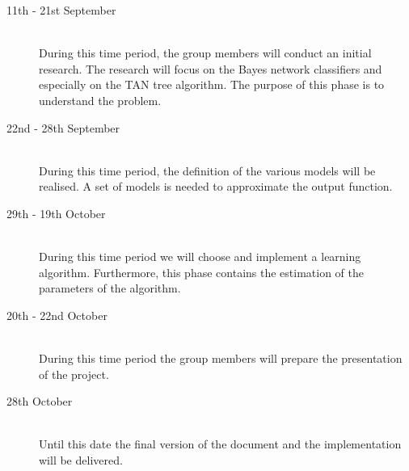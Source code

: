 \documentclass[a4paper, 11pt]{scrartcl}
\begin{document}
\begin{description}
	\item[11th - 21st September]\-\\
	During this time period, the group members will conduct an initial research. The research will focus on the Bayes network classifiers and especially on the TAN tree algorithm. The purpose of this phase is to understand the problem.
	\item[22nd - 28th September]\-\\
	During this time period, the definition of the various models will be realised. A set of models is needed to approximate the output function.
	\item[29th - 19th October]\-\\
	During this time period we will choose and implement a learning algorithm. Furthermore, this phase contains the estimation of the parameters of the algorithm.
	\item[20th - 22nd October]\-\\
	During this time period the group members will prepare the presentation of the project.
	\item[28th October]\-\\
	Until this date the final version of the document and the implementation will be delivered.
\end{description}


\nocite{*} %


\end{document}
